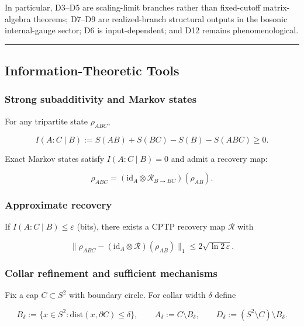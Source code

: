 In particular, D3--D5 are scaling-limit branches rather than fixed-cutoff matrix-algebra theorems; D7--D9 are realized-branch structural outputs in the bosonic internal-gauge sector; D6 is input-dependent; and D12 remains phenomenological.

\begin{center}\rule{0.5\linewidth}{0.5pt}\end{center}
\subsection{Information-Theoretic Tools}\label{2-information-theoretic-tools}

\subsubsection{Strong subadditivity and Markov states}\label{21-strong-subadditivity-and-markov-states}

For any tripartite state \(\rho_{ABC}\),

\[
I(A:C \mid B) := S(AB) + S(BC) - S(B) - S(ABC) \ge 0.
\]

Exact Markov states satisfy \(I(A:C \mid B) = 0\) and admit a recovery map:

\[
\rho_{ABC} = (\mathrm{id}_A \otimes \mathcal R_{B\to BC})(\rho_{AB}).
\]

\subsubsection{Approximate recovery}\label{22-approximate-recovery}

If \(I(A:C \mid B) \le \varepsilon\) (bits), there exists a CPTP recovery map \(\mathcal{R}\) with

\[
\| \rho_{ABC} - (\mathrm{id}_A \otimes \mathcal R)(\rho_{AB}) \|_1
\le 2 \sqrt{\ln 2\, \varepsilon}.
\]

\subsubsection{Collar refinement and sufficient mechanisms}\label{23-collar-refinement-and-sufficient-mechanisms}

Fix a cap \(C \subset S^2\) with boundary circle. For collar width \(\delta\) define

\[
B_\delta := \{x \in S^2 : \mathrm{dist}(x,\partial C) \le \delta\},
\qquad
A_\delta := C \setminus B_\delta,
\qquad
D_\delta := (S^2 \setminus C) \setminus B_\delta.
\]

